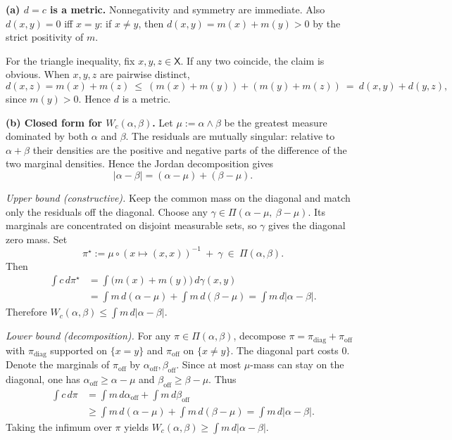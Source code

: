 \documentclass[11pt,a4paper]{article}
\theoremstyle{exostyle}
\begin{document}
\begin{solution}
\textbf{(a) $d=c$ is a metric.}
Nonnegativity and symmetry are immediate. Also $d(x,y)=0$ iff $x=y$:
if $x\neq y$, then $d(x,y)=m(x)+m(y)>0$ by the strict positivity of $m$.

For the triangle inequality, fix $x,y,z\in\mathsf X$. If any two coincide, the claim is obvious.
When $x,y,z$ are pairwise distinct,
\[
d(x,z)=m(x)+m(z)\ \le\ (m(x)+m(y))+(m(y)+m(z))\ =\ d(x,y)+d(y,z),
\]
since $m(y)>0$. Hence $d$ is a metric.

\medskip
\textbf{(b) Closed form for $W_c(\alpha,\beta)$.}
Let $\mu:=\alpha\wedge\beta$ be the greatest measure dominated by both $\alpha$ and $\beta$.
The residuals are mutually singular: relative to $\alpha+\beta$ their
densities are the positive and negative parts of the difference of the
two marginal densities. Hence the Jordan decomposition gives
\[
|\alpha-\beta|=(\alpha-\mu)+(\beta-\mu).
\]

\emph{Upper bound (constructive).}
Keep the common mass on the diagonal and match only the residuals off the diagonal.
Choose any $\gamma\in\Pi(\alpha-\mu,\ \beta-\mu)$. Its marginals are
concentrated on disjoint measurable sets, so $\gamma$ gives the diagonal
zero mass. Set
\[
\pi^\star:=\mu\circ(x\mapsto(x,x))^{-1}\ +\ \gamma\ \in\ \Pi(\alpha,\beta).
\]
Then
\begin{align*}
\int c\,d\pi^\star
&=\int\big(m(x)+m(y)\big)\,d\gamma(x,y)\\
&=\int m\,d(\alpha-\mu)+\int m\,d(\beta-\mu)
=\int m\,d|\alpha-\beta|.
\end{align*}
Therefore $W_c(\alpha,\beta)\le \int m\,d|\alpha-\beta|$.

\emph{Lower bound (decomposition).}
For any $\pi\in\Pi(\alpha,\beta)$, decompose $\pi=\pi_{\mathrm{diag}}+\pi_{\mathrm{off}}$ with
$\pi_{\mathrm{diag}}$ supported on $\{x=y\}$ and $\pi_{\mathrm{off}}$ on $\{x\neq y\}$.
The diagonal part costs $0$. Denote the marginals of $\pi_{\mathrm{off}}$ by
$\alpha_{\mathrm{off}},\beta_{\mathrm{off}}$.
Since at most $\mu$-mass can stay on the diagonal, one has
$\alpha_{\mathrm{off}}\ge \alpha-\mu$ and $\beta_{\mathrm{off}}\ge \beta-\mu$.
Thus
\begin{align*}
\int c\,d\pi
&=\int m\,d\alpha_{\mathrm{off}}+\int m\,d\beta_{\mathrm{off}}\\
&\ge\int m\,d(\alpha-\mu)+\int m\,d(\beta-\mu)
=\int m\,d|\alpha-\beta|.
\end{align*}
Taking the infimum over $\pi$ yields $W_c(\alpha,\beta)\ge \int m\,d|\alpha-\beta|$.


\end{solution}
\end{document}
